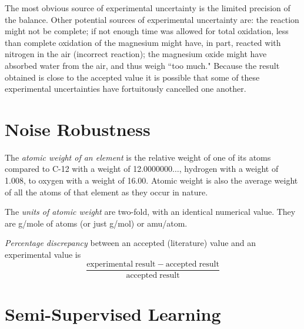 \documentclass{article}
\begin{document}
The most obvious source of experimental uncertainty is the limited precision of the balance. Other potential sources of experimental uncertainty are: the reaction might not be complete; if not enough time was allowed for total oxidation, less than complete oxidation of the magnesium might have, in part, reacted with nitrogen in the air (incorrect reaction); the magnesium oxide might have absorbed water from the air, and thus weigh ``too much." Because the result obtained is close to the accepted value it is possible that some of these experimental uncertainties have fortuitously cancelled one another.


\section{Noise Robustness}

\begin{enumerate}
\begin{item}
The \emph{atomic weight of an element} is the relative weight of one of its atoms compared to C-12 with a weight of 12.0000000$\ldots$, hydrogen with a weight of 1.008, to oxygen with a weight of 16.00. Atomic weight is also the average weight of all the atoms of that element as they occur in nature.
\end{item}
\begin{item}
The \emph{units of atomic weight} are two-fold, with an identical numerical value. They are g/mole of atoms (or just g/mol) or amu/atom.
\end{item}
\begin{item}
\emph{Percentage discrepancy} between an accepted (literature) value and an experimental value is
\begin{equation*}
\frac{\mathrm{experimental\;result} - \mathrm{accepted\;result}}{\mathrm{accepted\;result}}
\end{equation*}
\end{item}
\end{enumerate}



\section{Semi-Supervised Learning}
\end{document}
